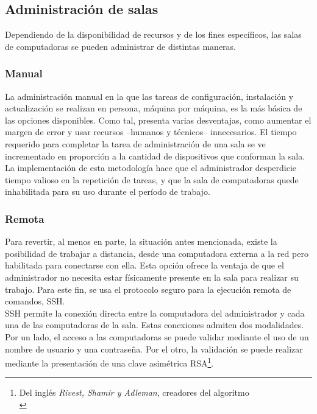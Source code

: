 \documentclass[a4paper,12pt]{article}
\begin{document}
\subsection{Administración de salas}
\label{sec:orgheadline10}

Dependiendo de la disponibilidad de recursos y de los fines específicos, las salas de computadoras se pueden administrar de distintas maneras.\\

\subsubsection{Manual}
\label{sec:orgheadline6}

La administración manual en la que las tareas de configuración, instalación y actualización se realizan en persona, máquina por máquina, es la más básica de las opciones disponibles. Como tal, presenta varias desventajas, como aumentar el margen de error y usar recursos --humanos y técnicos-- innecesarios. El tiempo requerido para completar la tarea de administración de una sala se ve incrementado en proporción a la cantidad de dispositivos que conforman la sala. La implementación de esta metodología hace que el administrador desperdicie tiempo valioso en la repetición de tareas, y que la sala de computadoras quede inhabilitada para su uso durante el período de trabajo.\\

\subsubsection{Remota}
\label{sec:orgheadline7}

Para revertir, al menos en parte, la situación antes mencionada, existe la posibilidad de trabajar a distancia, desde una computadora externa a la red pero habilitada para conectarse con ella. Esta opción ofrece la ventaja de que el administrador no necesita estar físicamente presente en la sala para realizar su trabajo. Para este fin, se usa el protocolo seguro para la ejecución remota de comandos, SSH.\\

SSH permite la conexión directa entre la computadora del administrador y cada una de las computadoras de la sala. Estas conexiones admiten dos modalidades. Por un lado, el acceso a las computadoras se puede validar mediante el uso de un nombre de usuario y una contraseña. Por el otro, la validación se puede realizar mediante la presentación de una clave asimétrica RSA\footnote{Del inglés \emph{Rivest, Shamir y Adleman}, creadores del algoritmo\\}.\\
\end{document}
